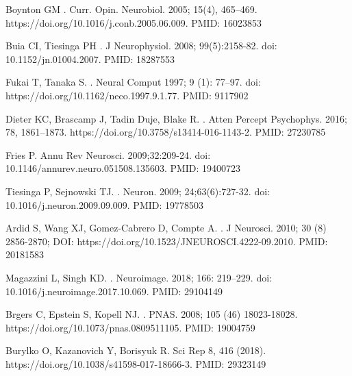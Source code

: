 \documentclass[10pt,letterpaper]{article}
\begin{document}
\begin{thebibliography}{10}
Boynton GM
.
\newblock Curr. Opin. Neurobiol. 2005; 15(4), 465–469. https://doi.org/10.1016/j.conb.2005.06.009. PMID: 16023853

Buia CI, Tiesinga PH
.
\newblock J Neurophysiol. 2008; 99(5):2158-82. doi: 10.1152/jn.01004.2007. PMID: 18287553

Fukai T, Tanaka S.
.
\newblock Neural Comput 1997; 9 (1): 77–97. doi: https://doi.org/10.1162/neco.1997.9.1.77. PMID: 9117902

Dieter KC, Brascamp J, Tadin Duje, Blake R.
.
\newblock Atten Percept Psychophys. 2016; 78, 1861–1873. https://doi.org/10.3758/s13414-016-1143-2. PMID: 27230785


Fries P.
\newblock Annu Rev Neurosci. 2009;32:209-24. doi: 10.1146/annurev.neuro.051508.135603. PMID: 19400723


Tiesinga P, Sejnowski TJ.
.
\newblock Neuron. 2009; 24;63(6):727-32. doi: 10.1016/j.neuron.2009.09.009. PMID: 19778503


Ardid S, Wang XJ, Gomez-Cabrero D, Compte A.
.
\newblock J Neurosci. 2010; 30 (8) 2856-2870; DOI: https://doi.org/10.1523/JNEUROSCI.4222-09.2010. PMID: 20181583


Magazzini L, Singh KD.
.
\newblock Neuroimage. 2018; 166: 219–229. doi: 10.1016/j.neuroimage.2017.10.069. PMID: 29104149

Brgers C, Epstein S, Kopell NJ.
.
\newblock PNAS. 2008; 105 (46) 18023-18028. https://doi.org/10.1073/pnas.0809511105. PMID: 19004759

Burylko O, Kazanovich Y, Borisyuk R.
\newblock Sci Rep 8, 416 (2018). https://doi.org/10.1038/s41598-017-18666-3. PMID: 29323149




\end{thebibliography}
\end{document}
